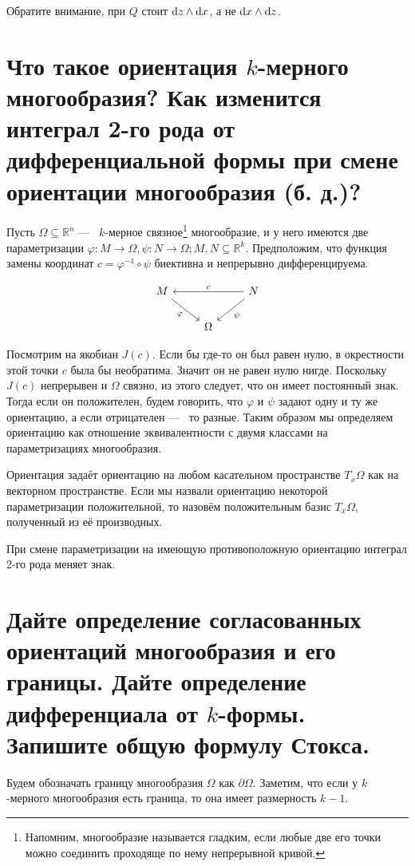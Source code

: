 \documentclass{article}
\begin{document}
	Обратите внимание, при $Q$ стоит $\mathrm{d} z \land \mathrm{d} x$, а не $\mathrm{d} x \land \mathrm{d} z$. 

	\section{Что такое ориентация $k$-мерного многообразия? Как изменится интеграл 2-го рода от дифференциальной формы при смене ориентации многообразия (б. д.)?}

	Пусть $\Omega \subseteq \mathbb{R}^n$ ---~ $k$-мерное связное\footnote{Напомним, многообразие называется гладким, если любые две его точки можно соединить проходяще по нему непрерывной кривой.} многообразие, и у него имеются две параметризации $\varphi: M \to \Omega, \psi: N \to \Omega; M, N \subseteq \mathbb{R}^k$. Предположим, что функция замены координат $c = \varphi^{-1} \circ \psi$ биективна и непрерывно дифференцируема.

	\[ \begin{tikzcd}
		M \arrow[swap]{rd}{\varphi} &  &\arrow[swap]{ll}{c} N \arrow{ld}{\psi} \\
		& \Omega
	\end{tikzcd} \]

	Посмотрим на якобиан $J(c)$. Если бы где-то он был равен нулю, в окрестности этой точки $c$ была бы необратима. Значит он не равен нулю нигде. Поскольку $J(c)$ непрерывен и $\Omega$ связно, из этого следует, что он имеет постоянный знак. Тогда если он положителен, будем говорить, что $\varphi$ и $\psi$ задают одну и ту же ориентацию, а если отрицателен ---~ то разные. Таким образом мы определяем ориентацию как отношение эквивалентности с двумя классами на параметризациях многообразия.

	Ориентация задаёт ориентацию на любом касательном пространстве $T_{x}\Omega$ как на векторном пространстве. Если мы назвали ориентацию некоторой параметризации положительной, то назовём положительным базис $T_x \Omega$, полученный из её производных.

	При смене параметризации на имеющую противоположную ориентацию интеграл 2-го рода меняет знак. 

	\section{Дайте определение согласованных ориентаций многообразия и его границы. Дайте определение дифференциала от $k$-формы. Запишите общую формулу Стокса.}
	Будем обозначать границу многообразия $\Omega$ как $\partial \Omega$. Заметим, что если у $k$-мерного многообразия есть граница, то она имеет размерность $k - 1$.
\end{document}
